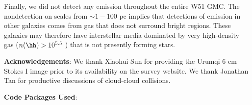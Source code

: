 Finally, we did not detect any \formaldehyde emission throughout the entire W51
GMC.  The nondetection on scales from $\sim1-100$ pc implies that detections of
\formaldehyde \oneone emission in other galaxies comes from gas that does not
surround bright \hii regions.  These galaxies may therefore have interstellar
media dominated by very high-density gas ($n(\hh)>10^{5.5}$ \percc) that is not
presently forming stars.



 
% 
% 

\textbf{Acknowledgements}:
We thank Xiaohui Sun for providing the Urumqi 6 cm Stokes I image prior to its
availability on the survey website.  We thank Jonathan Tan for productive
discussions of cloud-cloud collisions.

\textbf{Code Packages Used}:

